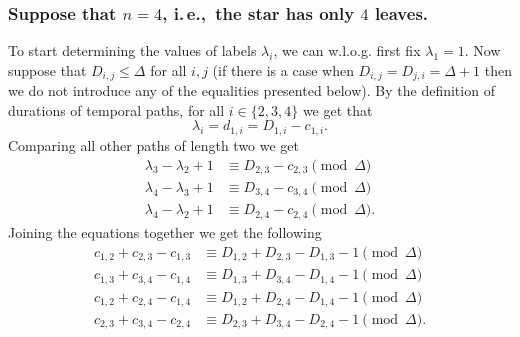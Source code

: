 \documentclass[a4paper,UKenglish,cleveref, autoref, thm-restate]{lipics-v2021}
\newcommand{\ie}{i.\,e.,\ }
\begin{document}
\subsubsection*{Suppose that $n = 4$, \ie the star has only $4$ leaves.}
To start determining the values of labels $\lambda_i$, 
we can w.l.o.g. first fix $\lambda_1 = 1$.
Now suppose that $D_{i,j} \leq \Delta$ for all $i,j$ (if there is a case when $D_{i,j} = D_{j,i} = \Delta + 1$ then we do not introduce any of the equalities presented below).
By the definition of durations of temporal paths,
for all $i \in \{2,3,4\}$ we get that 
\begin{equation}\label{eq:lambdai-from1}
    \lambda_i = d_{1,i} = D_{1,i} - c_{1,i}.
\end{equation}
Comparing all other paths of length two we get
\begin{align}
    \lambda_3 - \lambda_2 + 1 & \equiv D_{2,3} - c_{2,3} \pmod{\Delta} \label{eq:D23} \\
    \lambda_4 - \lambda_3 + 1 & \equiv D_{3,4} - c_{3,4} \pmod{\Delta} \label{eq:D34} \\
    \lambda_4 - \lambda_2 + 1 & \equiv D_{2,4} - c_{2,4} \pmod{\Delta}.\label{eq:D24} 
\end{align}
Joining the equations together we get the following
\begin{align}
    c_{1,2} + c_{2,3} - c_{1,3} & \equiv D_{1,2} + D_{2,3} - D_{1,3} -1 \pmod{\Delta} \label{eq:c123} \\
    c_{1,3} + c_{3,4} - c_{1,4} & \equiv D_{1,3} + D_{3,4} - D_{1,4} -1 \pmod{\Delta} \label{eq:c134} \\
    c_{1,2} + c_{2,4} - c_{1,4} & \equiv D_{1,2} + D_{2,4} - D_{1,4} -1 \pmod{\Delta} \label{eq:c124} \\
    c_{2,3} + c_{3,4} - c_{2,4} & \equiv D_{2,3} + D_{3,4} - D_{2,4} -1 \pmod{\Delta}. \label{eq:c234}
\end{align}
\end{document}
